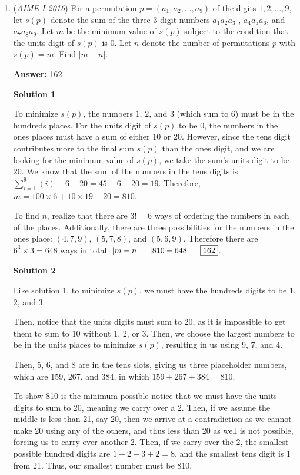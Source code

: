\begin{enumerate}
 Thus, the answer is $87 + 16 = \boxed{103}$.

 


	\item (\textit{AIME I 2016}) For a permutation $p = (a_1,a_2,\ldots,a_9)$ of the digits $1,2,\ldots,9$, let $s(p)$ denote the sum of the three $3$-digit numbers $a_1a_2a_3$ , $a_4a_5a_6$, and $a_7a_8a_9$. Let $m$ be the minimum value of $s(p)$ subject to the condition that the units digit of $s(p)$ is $0$. Let $n$ denote the number of permutations $p$ with $s(p) = m$. Find $|m - n|$.


 
 \textbf{Answer: }162



\textbf{Solution 1}

To minimize $s(p)$, the numbers $1$, $2$, and $3$ (which sum to $6$) must be in the hundreds places.  For the units digit of $s(p)$ to be $0$, the numbers in the ones places must have a sum of either $10$ or $20$. However, since the tens digit contributes more to the final sum $s(p)$ than the ones digit, and we are looking for the minimum value of $s(p)$, we take the sum's units digit to be $20$. We know that the sum of the numbers in the tens digits is $\sum\limits_{i=1}^9 (i) -6-20=45-6-20=19$. Therefore, $m=100\times6+10\times19+20=810$.

 To find $n$, realize that there are $3!=6$ ways of ordering the numbers in each of the places.  Additionally, there are three possibilities for the numbers in the ones place: $(4,7,9)$, $(5,7,8)$, and $(5,6,9)$.  Therefore there are $6^3\times3=648$ ways in total. $|m-n|=|810-648|=\fbox{162}$.

 



\textbf{Solution 2}

Like solution 1, to minimize \( s(p) \), we must have the hundreds digits to be 1, 2, and 3.

 Then, notice that the units digits must sum to 20, as it is impossible to get them to sum to 10 without 1, 2, or 3. Then, we choose the largest numbers to be in the units places to minimize \( s(p) \), resulting in us using 9, 7, and 4.

 Then, 5, 6, and 8 are in the tens slots, giving us three placeholder numbers, which are 159, 267, and 384, in which \( 159+267+384 = 810 \).

 To show 810 is the minimum possible notice that we must have the units digits to sum to 20, meaning we carry over a 2. Then, if we assume the middle is less than 21, say 20, then we arrive at a contradiction as we cannot make 20 using any of the others, and thus less than 20 as well is not possible, forcing us to carry over another 2. Then, if we carry over the 2, the smallest possible hundred digits are \( 1+2+3+2 = 8 \), and the smallest tens digit is 1 from 21. Thus, our smallest number must be 810.


\end{enumerate}
